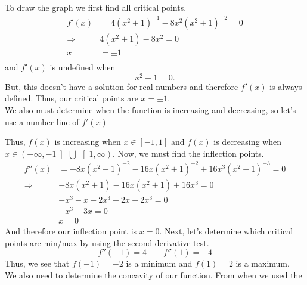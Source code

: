 \documentclass{hwset}
\begin{document}
\begin{solution}
	To draw the graph we first find all critical points.
	\begin{align*}
		f'(x) &= 4(x^2+1)^{-1} - 8x^2(x^2+1)^{-2} = 0 \\
		\Rightarrow& 4(x^2+1) - 8x^2 = 0 \\
		x &= \pm 1 \\
	\end{align*}
	and $f'(x)$ is undefined when
	\begin{equation*}
		x^2 + 1 = 0.
	\end{equation*}
	But, this doesn't have a solution for real numbers and therefore $f'(x)$ is
	always defined. Thus, our critical points are $x=\pm 1$. \\
	We also must determine when the function is increasing and decreasing, so
	let's use a number line of $f'(x)$
	\begin{center}
	\end{center}
	Thus, $f(x)$ is increasing when $x\in [-1, 1]$ and $f(x)$ is decreasing when
	$x \in \left(-\infty, -1\left]\, \bigcup\, \right[1, \infty\right)$.
	Now, we must find the inflection points.
	\begin{align*}
		f''(x) &= -8x(x^2+1)^{-2} - 16x(x^2+1)^{-2} + 16x^3(x^2+1)^{-3} = 0 \\
		\Rightarrow& -8x(x^2+1) - 16x(x^2+1) + 16x^3 = 0 \\ 
		&-x^3 - x - 2x^3 - 2x + 2x^3 = 0 \\ 
		&-x^3 - 3x = 0 \\ 
		&x = 0
	\end{align*}
	And therefore our inflection point is $x = 0$.
	Next, let's determine which critical points are min/max by using the second
	derivative test.
	\begin{equation*}
		f''(-1) = 4 \qquad f''(1) = -4
	\end{equation*}
	Thus, we see that $f(-1) = -2$ is a minimum and $f(1) = 2$ is a maximum. \\
	We also need to determine the concavity of our function. From when we used the

\end{solution}
\end{document}
